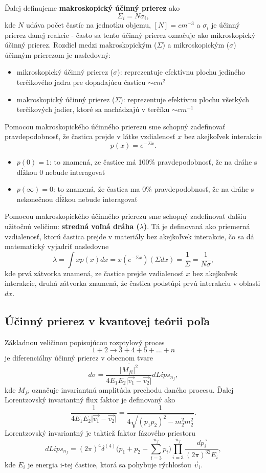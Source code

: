 \documentclass[../../main.tex]{subfiles}
\begin{document}
Ďalej definujeme \textbf{makroskopický účinný prierez} ako 
$$ \Sigma_i = N \sigma_i,$$
kde $N$ udáva počet častíc na jednotku objemu, $[N]=cm^{-3}$ a $\sigma_i$ je účinný prierez danej reakcie - často sa tento účinný prierez označuje ako mikroskopický účinný prierez. Rozdiel medzi makroskopickým ($\Sigma$) a mikroskopickým ($\sigma$) účinným prierezom je nasledovný: 
\begin{itemize}
\item mikroskopický účinný prierez ($\sigma$): reprezentuje efektívnu plochu jediného terčikového jadra pre dopadajúcu časticu $\sim cm^2$
\item makroskopický účinný prierez ($\Sigma$): reprezentuje efektívnu plochu všetkých terčikových jadier, ktoré sa nachádzajú v terčíku $\sim cm^{-1}$
\end{itemize}
 
Pomocou makroskopického účinného prierezu sme schopný zadefinovať pravdepodobnosť, že častica prejde v látke vzdialenosť $x$ bez akejkoľvek interakcie
$$ p(x) = e^{-\Sigma x}.$$
\begin{itemize}
\item $p(0) = 1$: to znamená, ze častice má 100$\%$ pravdepodobnosť, že na dráhe s dĺžkou 0 nebude interagovať 
\item $p(\infty) = 0$: to znamená, že častica ma 0$\%$ pravdepodobnosť, že na dráhe s nekonečnou dĺžkou nebude interagovať
\end{itemize}

Pomocou makroskopického účinného prierezu sme schopný zadefinovať ďalšiu užitočnú veličinu: \textbf{stredná voľná dráha ($\lambda$)}. Tá je definovaná ako priemerná vzdialenosť, ktorú častica prejde v materiály bez akejkoľvek interakcie, čo sa dá matematický vyjadriť nasledovne
$$ \lambda = \int x p(x) dx = x(e^{-\Sigma x}) (\Sigma dx)  = \frac{1}{\Sigma} = \frac{1}{N\sigma},$$
kde prvá zátvorka znamená, ze častice prejde vzdialenosť $x$ bez akejkoľvek interakcie, druhá zátvorka znamená, že častica podstúpi prvú interakciu v oblasti $dx$.

\subsection{Účinný prierez v kvantovej teórii poľa}
Základnou veličinou popisujúcou rozptylový proces 
$$ 1+2 \rightarrow 3+4+5+...+n $$
je diferenciálny účinný prierez v obecnom tvare
$$ d\sigma = \frac{ \overline{ \vert M_{fi}\vert^2 }}{4E_1E_2\vert \vec{v_1}-\vec{v_2} \vert} dLips_{n_f},$$
kde $M_{fi}$ označuje invariantnú amplitúda prechodu daného procesu. Ďalej Lorentzovský invariantný flux faktor je definovaný ako 
$$ \frac{1}{4E_1E_2\vert \vec{v_1} - \vec{v_2} \vert} = \frac{1} {4\sqrt{ (p_1p_2)^2 - m_2^2 m_2^2}}.$$
Lorentzovský invariantný je taktiež faktor fázového priestoru 
$$ dLips_{n_f} = (2\pi)^4\delta^{(4)} \bigg(p_1+p_2-\sum_{i=3}^{n_f}p_i \bigg)\prod_{i=3}^{n_f}\frac{d\vec{p_i}}{(2\pi)^32E_i},$$
kde $E_i$ je energia i-tej častice, ktorá sa pohybuje rýchlosťou $\vec{v}_i$.
\end{document}

